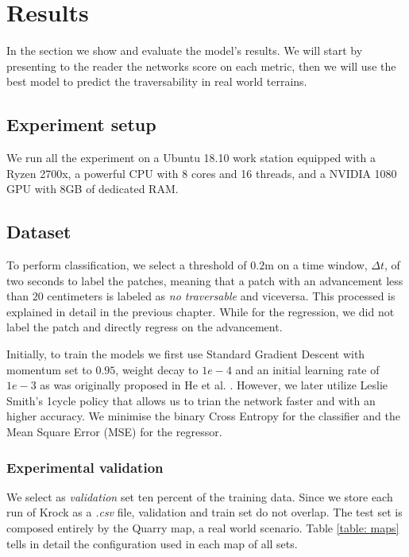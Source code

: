 \documentclass[../document.tex]{subfiles}
\begin{document}
\chapter{Results}
\label{chap: results}
In the section we show and evaluate the model's results. We will start by presenting to the reader the networks score on each metric, then we will use the best model to predict the traversability in real world terrains. 
\section{Experiment setup}
We run all the experiment on a Ubuntu 18.10  work station equipped with a Ryzen 2700x, a powerful CPU with 8 cores and 16 threads, and a NVIDIA 1080 GPU with 8GB of dedicated RAM.
\section{Dataset}
To perform classification, we select a threshold of $0.2$m on a time window, $\Delta t$, of two seconds to label the patches, meaning that a patch with an advancement less than $20$ centimeters is labeled as \emph{no traversable} and viceversa. This processed is explained in detail in the previous chapter. While for the regression, we did not label the patch and directly regress on the advancement.

Initially, to train the models we first use Standard Gradient Descent with momentum set to $0.95$, weight decay to $1e-4$ and an initial learning rate of $1e-3$ as was originally proposed in He et al. \cite{he2015deep}. However, we later utilize Leslie Smith's 1cycle policy \cite{1cycle} that allows us to trian the network faster and with an higher accuracy. We minimise the binary Cross Entropy for the classifier and the  Mean Square Error (MSE) for the regressor.
\subsection{Experimental validation}
We select as \emph{validation} set ten percent of the training data. Since we store each run of Krock as a \emph{.csv} file, validation and train set do not overlap. 
The test set is composed entirely by the Quarry map, a real world scenario. Table \ref{table: maps} tells in detail the configuration used in each map of all sets.
\end{document}
